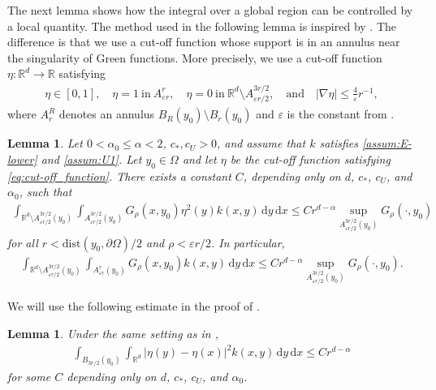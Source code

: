 \documentclass[reqno]{amsart}
\theoremstyle{plain}
\newtheorem{lemma}[theorem]{Lemma}
\theoremstyle{definition}
\numberwithin{equation}{section}
\newcommand{\R}{\mathbb{R}}
\newcommand{\Rd}{\mathbb{R}^d}
\newcommand{\dx} {\, \mathrm{d}x}
\newcommand{\dy} {\, \mathrm{d}y}
\newcommand{\cl} {c_{\ast}}
\newcommand{\cU} {c_U}
\begin{document}
The next lemma shows how the integral over a global region can be controlled by 
a local quantity. The method used in the following lemma is inspired by 
\cite[Lemma 4.2]{DCKP14}. The difference is that we use a cut-off function 
whose support is in an annulus near the singularity of Green functions. 
More precisely, we use a cut-off function $\eta : \Rd \rightarrow \R$ satisfying 
\begin{align} \label{eq:cut-off_function}
\eta \in [0,1], \quad 
\eta = 1~\text{in}~ A^r_{\varepsilon r}, \quad 
\eta = 0 ~\text{in}~ \Rd \setminus A^{3r/2}_{\varepsilon r/2}, \quad\text{and}\quad 
| \nabla \eta | \leq \frac{4}{\varepsilon} r^{-1},
\end{align}
where $A^R_r$ denotes an annulus $B_R(y_0) \setminus B_r(y_0)$ and $\varepsilon$ is the constant from .

\begin{lemma} \label{lem:global_term}
Let $0 < \alpha_0 \leq \alpha < 2$, $\cl, \cU > 0$, and assume that $k$ satisfies \eqref{assum:E-lower} and \eqref{assum:U1}. Let $y_0 \in \Omega$ and let $\eta$ be the cut-off function satisfying \eqref{eq:cut-off_function}. There exists a constant $C$, depending only on $d$, $\cl$, $\cU$, and $\alpha_0$, such that
\begin{align} \label{eq:global_term_eta}
\int_{\Rd \setminus A^{3r/2}_{\varepsilon r/2}(y_0)}
\int_{A^{3r/2}_{\varepsilon r/2}(y_0)}G_{\rho}(x, y_0) \eta^2(y) k(x,y) \dy \dx
\leq C r^{d-\alpha} \sup_{A^{3r/2}_{\varepsilon r/2}(y_0)} G_{\rho}(\cdot, y_0)
\end{align}
for all $r < \mathrm{dist}(y_0, \partial \Omega)/2$ and $\rho < \varepsilon r/2$. In particular, 
\begin{align} \label{eq:global_term}
\int_{\Rd \setminus A^{3r/2}_{\varepsilon r/2}(y_0)}
\int_{A^r_{\varepsilon r}(y_0)}G_{\rho}(x, y_0) k(x,y) \dy \dx
\leq C r^{d-\alpha} \sup_{A^{3r/2}_{\varepsilon r/2}(y_0)} G_{\rho}(\cdot, y_0).
\end{align}
\end{lemma}

We will use the following estimate in the proof of .

\begin{lemma} \label{lem:cut-off_function}
Under the same setting as in ,
\begin{align} \label{eq:cut-off}
\int_{B_{3r/2}(y_0)} \int_{\Rd} |\eta(y) - \eta(x)|^2 k(x,y) \dy \dx \leq C r^{d-\alpha}
\end{align}
for some $C$ depending only on $d$, $\cl$, $\cU$, and $\alpha_0$.
\end{lemma}
\end{document}

